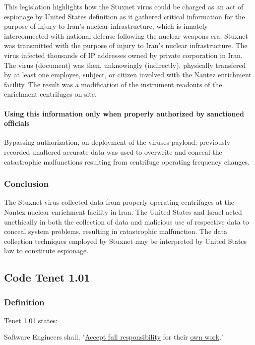 \documentclass[12pt]{article}
\begin{document}
\begin{multicols}{2}
This legislation highlights how the Stuxnet virus could be charged as an act of espionage by United States definition as it gathered critical information for the purpose of injury to Iran's nuclear infrastructure, which is innately interconnected with national defense following the nuclear weapons era. Stuxnet was transmitted with the purpose of injury to Iran's nuclear infrastructure. The virus infected thousands of IP addresses owned by private corporation in Iran. The virus (document) was then, unknowingly (indirectly), physically transfered by at least one employee, subject, or citizen involved with the Nantez enrichment facility. The result was a modification of the instrument readouts of the enrichment centrifuges on-site.

\paragraph{Using this information only when properly authorized by sanctioned officials}

Bypassing authorization, on deployment of the viruses payload, previously recorded unaltered accurate data was used to overwrite and conceal the catastrophic malfunctions resulting from centrifuge operating frequency changes.

\subsubsection{Conclusion}

The Stuxnet virus collected data from properly operating centrifuges at the Nantez nuclear enrichment facility in Iran.  The United States and Israel acted unethically in both the collection of data and malicious use of respective data to conceal system problems, resulting in catastrophic malfunction. The data collection techniques employed by Stuxnet may be interpreted by United States law to constitute espionage.

\subsection{Code Tenet 1.01}

\subsubsection{Definition}

Tenet 1.01 states:
\begin{framed}
Software Engineers shall, "\underline{Accept full responsibility} for their \underline{own work}."\cite{softwareEngineeringCodeOfEthics}
\end{framed}


\end{multicols}
\end{document}

